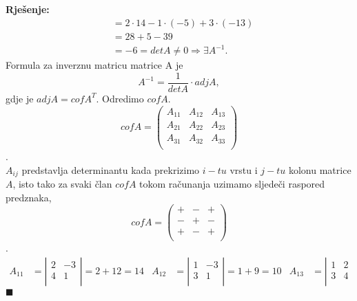 \documentclass{article}
\newenvironment{solution}{\noindent\textbf{Rje\v senje:\newline}}{$\blacksquare$}
\begin{document}
\begin{solution}
\begin{equation*}
\begin{aligned}
        &=2\cdot 14 -1\cdot (-5)+3\cdot (-13)\\
        &=28+5-39\\
        &=-6=detA\neq 0\Rightarrow\exists A^{-1}.
        \end{aligned}
    \end{equation*}
    Formula za inverznu matricu matrice A je
    $$A^{-1}=\frac{1}{detA}\cdot adjA,$$
    gdje je $adjA=cofA^T$. Odredimo $cofA$.
    \begin{equation*}
        cofA=\left(
        \begin{array}{ccc}
            A_{11} & A_{12} & A_{13} \\
            A_{21} & A_{22} & A_{23} \\
            A_{31} & A_{32} & A_{33} \\
        \end{array}
        \right)
        \end{equation*}.\\
        $A_{ij}$ predstavlja determinantu kada prekrizimo $i-tu$ vrstu i $j-tu$ kolonu matrice $A$, isto tako za svaki \v clan $cofA$ tokom ra\v cunanja
        uzimamo sljede\v ci raspored predznaka,
        \begin{equation*}
            cofA=\left(
            \begin{array}{ccc}
                + & - & + \\
                - & + & - \\
                + & - & + \\
            \end{array}
            \right)
            \end{equation*}.\\
    \begin{align*}
        A_{11}&=\left|
        \begin{array}{cc}
            2 & -3 \\
            4 & 1 \\
        \end{array}
        \right|=2+12=14 &
        A_{12}&=\left|
        \begin{array}{cc}
            1 & -3 \\
            3 & 1 \\
        \end{array}
        \right|=1+9=10 &
        A_{13}&=\left|
        \begin{array}{cc}
            1 & 2 \\
            3 & 4 \\

\end{array}
\end{align*}
\end{solution}
\end{document}
